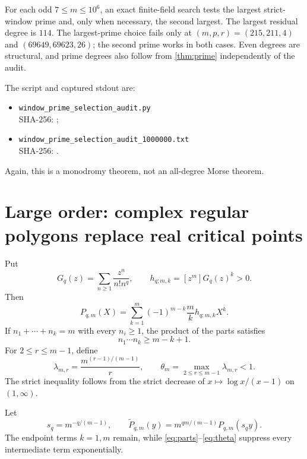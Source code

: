 \documentclass[11pt]{article}
\theoremstyle{keio}
\theoremstyle{definition}
\theoremstyle{remark}
\begin{document}
For each odd $7\le m\le10^6$, an exact finite-field search tests the largest
strict-window prime and, only when necessary, the second largest. The largest
residual degree is $114$. The largest-prime choice fails only at
$(m,p,r)=(215,211,4)$ and $(69649,69623,26)$; the second prime works in both
cases. Even degrees are structural, and prime degrees also follow from
\cref{thm:prime} independently of the audit.

The script and captured stdout are:
\begin{itemize}
\item \nolinkurl{window_prime_selection_audit.py}\\[-.15em]
\textcolor{bluegray}{\small SHA-256: }
\texttt{\small{}};
\item \nolinkurl{window_prime_selection_audit_1000000.txt}\\[-.15em]
\textcolor{bluegray}{\small SHA-256: }
\texttt{\small{}}.
\end{itemize}

Again, this is a monodromy theorem, not an all-degree Morse theorem.

\section{Large order: complex regular polygons replace real critical points}

Put
\[
G_q(z)=\sum_{n\ge1}\frac{z^n}{n!n^q},
\qquad
h_{q;m,k}=[z^m]G_q(z)^k>0.
\]
Then
\begin{equation}
P_{q,m}(X)
=\sum_{k=1}^m(-1)^{m-k}\frac{m}{k}h_{q;m,k}X^k.
\label{eq:P-positive}
\end{equation}
If $n_1+\cdots+n_k=m$ with every $n_i\ge1$, the product of the parts
satisfies
\begin{equation}
n_1\cdots n_k\ge m-k+1.
\label{eq:parts}
\end{equation}
For $2\le r\le m-1$, define
\begin{equation}
\lambda_{m,r}=\frac{m^{(r-1)/(m-1)}}r,
\qquad
\theta_m=\max_{2\le r\le m-1}\lambda_{m,r}<1.
\label{eq:theta}
\end{equation}
The strict inequality follows from the strict decrease of
$x\mapsto\log x/(x-1)$ on $(1,\infty)$.

Let
\[
s_q=m^{-q/(m-1)},
\qquad
\widetilde P_{q,m}(y)
=m^{qm/(m-1)}P_{q,m}(s_qy).
\]
The endpoint terms $k=1,m$ remain, while
\eqref{eq:parts}--\eqref{eq:theta} suppress every intermediate term
exponentially.
\end{document}
